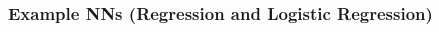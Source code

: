 \documentclass[xcolor={dvipsnames}]{beamer}
\begin{document}
\frame
{
 \frametitle{Example NNs (Regression and Logistic Regression)}


\begin{columns}
\begin{column}{.5\textwidth}
\hspace{.4in}
\end{column}
\begin{column}{.5\textwidth}
\end{column}
\end{columns}

}
\end{document}
